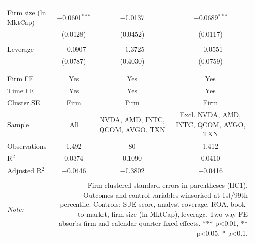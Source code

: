 \begin{table}[!htbp]
\begin{tabular}{@{\extracolsep{5pt}}lccc}
  & & & \\ 
 Firm size (ln MktCap) & $-$0.0601$^{***}$ & $-$0.0137 & $-$0.0689$^{***}$ \\ 
  & (0.0128) & (0.0452) & (0.0117) \\ 
  & & & \\ 
 Leverage & $-$0.0907 & $-$0.3725 & $-$0.0551 \\ 
  & (0.0787) & (0.4030) & (0.0759) \\ 
  & & & \\ 
\hline \\[-1.8ex] 
Firm FE & Yes & Yes & Yes \\ 
Time FE & Yes & Yes & Yes \\ 
Cluster SE & Firm & Firm & Firm \\ 
Sample & All & NVDA, AMD, INTC, QCOM, AVGO, TXN & Excl. NVDA, AMD, INTC, QCOM, AVGO, TXN \\ 
Observations & 1,492 & 80 & 1,412 \\ 
R$^{2}$ & 0.0374 & 0.1090 & 0.0410 \\ 
Adjusted R$^{2}$ & $-$0.0446 & $-$0.3802 & $-$0.0416 \\ 
\hline 
\hline \\[-1.8ex] 
\textit{Note:}  & \multicolumn{3}{r}{Firm-clustered standard errors in parentheses (HC1). Outcomes and control variables winsorised at 1st/99th percentile. Controls: SUE score, analyst coverage, ROA, book-to-market, firm size (ln MktCap), leverage. Two-way FE absorbs firm and calendar-quarter fixed effects. *** p<0.01, ** p<0.05, * p<0.1.} \\ 
\end{tabular} 
\end{table} 

